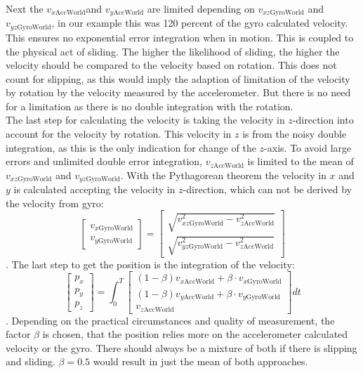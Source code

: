 \documentclass[letterpaper, 10 pt, conference]{ieeeconf}  %
\begin{document}
 
 Next the $v_{x\text{AccWorld}} $and $v_{y\text{AccWorld}} $ are limited depending on $v_{xz\text{GyroWorld}} $ and $ v_{yz\text{GyroWorld}}$, in our example this was 120 percent of the gyro calculated velocity.
 This ensures no exponential error integration when in motion.
 This is coupled to the physical act of sliding.
 The higher the likelihood of sliding, the higher the velocity should be compared to the velocity based on rotation.
 This does not count for slipping, as this would imply the adaption of limitation of the velocity by rotation by the velocity measured by the accelerometer.
 But there is no need for a limitation as there is no double integration with the rotation.\\
 The last step for calculating the velocity is taking the velocity in $z$-direction into account for the velocity by rotation.
 This velocity in $z$ is from the noisy double integration, as this is the only indication for change of the $z$-axis.
 To avoid large errors and unlimited double error integration, $v_{z\text{AccWorld}} $ is limited to the mean of $v_{xz\text{GyroWorld}} $ and $ v_{yz\text{GyroWorld}}$.
With the Pythagorean theorem the velocity in $x$ and $y$ is calculated accepting the velocity in $z$-direction, which can not be derived by the velocity from gyro:
 \begin{equation}
\begin{bmatrix}
v_{x\text{GyroWorld}} \\ v_{y\text{GyroWorld}}
\end{bmatrix} = 
\begin{bmatrix}
\sqrt{v_{xz\text{GyroWorld}}^2-v_{z\text{AccWorld}}^2}  \\ \sqrt{v_{yz\text{GyroWorld}}^2-v_{z\text{AccWorld}}^2 } 
\end{bmatrix}
\end{equation}.
The last step to get the position is the integration of the velocity:
\begin{equation}
\begin{bmatrix}
p_x \\ p_y \\p_z
\end{bmatrix}
 = \int_0^T \begin{bmatrix}
 (1-\beta)v_{x\text{AccWorld}} + \beta \cdot v_{x\text{GyroWorld}} 
 \\
  (1-\beta)v_{y\text{AccWorld}} + \beta \cdot v_{y\text{GyroWorld}} 
 \\
 v_{z\text{AccWorld}} 
 \end{bmatrix} dt
\end{equation}.
Depending on the practical circumstances and quality of measurement, the factor $\beta$ is chosen, that the position relies more on the accelerometer calculated velocity or the gyro.
There should always be a mixture of both if there is slipping and sliding.
$\beta =0.5$ would result in just the mean of both approaches.
\end{document}
